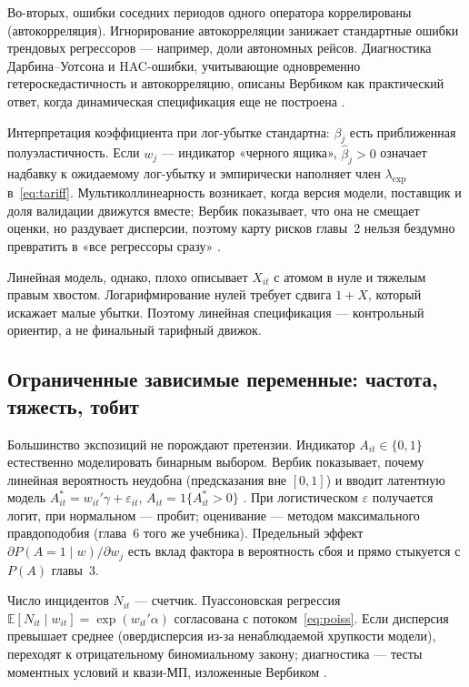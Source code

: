 \documentclass[a4paper,14pt]{extarticle}
\begin{document}
Во-вторых, ошибки соседних периодов одного оператора коррелированы (автокорреляция). Игнорирование автокорреляции занижает стандартные ошибки трендовых регрессоров --- например, доли автономных рейсов. Диагностика Дарбина--Уотсона и HAC-ошибки, учитывающие одновременно гетероскедастичность и автокорреляцию, описаны Вербиком как практический ответ, когда динамическая спецификация еще не построена \cite{verbeek}.

Интерпретация коэффициента при лог-убытке стандартна: $\beta_j$ есть приближенная полуэластичность. Если $w_{j}$ --- индикатор «черного ящика», $\hat\beta_j>0$ означает надбавку к ожидаемому лог-убытку и эмпирически наполняет член $\lambda_{\mathrm{exp}}$ в~\eqref{eq:tariff}. Мультиколлинеарность возникает, когда версия модели, поставщик и доля валидации движутся вместе; Вербик показывает, что она не смещает оценки, но раздувает дисперсии, поэтому карту рисков главы~2 нельзя бездумно превратить в «все регрессоры сразу» \cite{verbeek}.

Линейная модель, однако, плохо описывает $X_{it}$ с атомом в нуле и тяжелым правым хвостом. Логарифмирование нулей требует сдвига $1+X$, который искажает малые убытки. Поэтому линейная спецификация --- контрольный ориентир, а не финальный тарифный движок.

\subsection{Ограниченные зависимые переменные: частота, тяжесть, тобит}

Большинство экспозиций не порождают претензии. Индикатор $A_{it}\in\{0,1\}$ естественно моделировать бинарным выбором. Вербик показывает, почему линейная вероятность неудобна (предсказания вне $[0,1]$) и вводит латентную модель $A_{it}^*=w_{it}'\gamma+\varepsilon_{it}$, $A_{it}=1\{A_{it}^*>0\}$ \cite{verbeek}. При логистическом $\varepsilon$ получается логит, при нормальном --- пробит; оценивание --- методом максимального правдоподобия (глава~6 того же учебника). Предельный эффект $\partial P(A=1\mid w)/\partial w_j$ есть вклад фактора в вероятность сбоя и прямо стыкуется с $P(A)$ главы~3.

Число инцидентов $N_{it}$ --- счетчик. Пуассоновская регрессия $\mathbb{E}[N_{it}\mid w_{it}]=\exp(w_{it}'\alpha)$ согласована с потоком~\eqref{eq:poiss}. Если дисперсия превышает среднее (овердисперсия из-за ненаблюдаемой хрупкости модели), переходят к отрицательному биномиальному закону; диагностика --- тесты моментных условий и квази-МП, изложенные Вербиком \cite{verbeek}.
\end{document}
